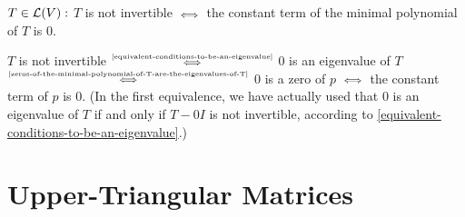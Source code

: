 \begin{thm}
  $T \in \mathcal{L} (V):$ $T$ is not invertible $\mathsmaller{\iff}$ the constant term of the minimal polynomial of $T$ is $0$.
\end{thm}
\begin{prf}
  $T$ is not invertible $\mathsmaller{\overset{\text{\ref{equivalent-conditions-to-be-an-eigenvalue}}}{\iff}}$ $0$ is an eigenvalue of $T$ $\mathsmaller{\overset{\text{\ref{zeros-of-the-minimal-polynomial-of-T-are-the-eigenvalues-of-T}}}{\iff}}$ $0$ is a zero of $p$ $\mathsmaller{\iff}$ the constant term of $p$ is $0$.
  (In the first equivalence, we have actually used that $0$ is an eigenvalue of $T$ if and only if $T-0I$ is not invertible, according to \ref{equivalent-conditions-to-be-an-eigenvalue}.)
  
\end{prf}

\section{Upper-Triangular Matrices}

